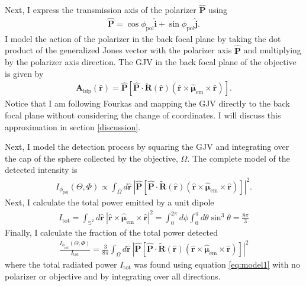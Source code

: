 \documentclass[11pt]{article}
\providecommand{\mb}[1]{\mathbf{#1}}
\providecommand{\mh}[1]{\mathbf{\hat{#1}}}
\providecommand{\bs}[1]{\boldsymbol{#1}}
\begin{document}
Next, I express the transmission axis of the polarizer $\mh{P}$ using
\begin{align}
  \hat{\mb{P}} = \cos\phi_{\text{pol}}\hat{\mb{i}} + \sin\phi_{\text{pol}}\hat{\mb{j}}. \label{eq:polarizer}
\end{align}
I model the action of the polarizer in the back focal plane by taking the
dot product of the generalized Jones vector with the polarizer axis $\mh{P}$ and multiplying by the polarizer axis direction. The GJV in the back focal plane of the objective is given by
\begin{align}
  \mb{A}_{\text{bfp}}(\mh{r}) = \mh{P}\left[\mh{P}\cdot\tilde{\mb{R}}(\mh{r})(\mh{r}\times\hat{\bs{\mu}}_{\text{em}}\times\mh{r})\right].\label{eq:approx}
\end{align}
Notice that I am following Fourkas and mapping the GJV directly to the back focal plane
without considering the change of coordinates. I will discuss this approximation in section \ref{discussion}.

Next, I model the detection process by squaring the GJV and integrating over
the cap of the sphere collected by the objective, $\Omega$. The complete model
of the detected intensity is
\begin{align}
  I_{\phi_{\text{pol}}}(\Theta, \Phi) \propto \int_{\Omega}d\mh{r}\ \left|\mh{P}\left[\mh{P}\cdot\tilde{\mb{R}}(\mh{r})(\mh{r}\times\hat{\bs{\mu}}_{\text{em}}\times\mh{r})\right]\right|^2. \label{eq:model1}
\end{align}
Next, I calculate the total power emitted by a unit dipole
\begin{align}
  I_{\text{tot}} = \int_{\mathbb{S}^2}d\mh{r}\ \left|\mh{r}\times\hat{\bs{\mu}}_{\text{em}}\times\mh{r}\right|^2 = \int_0^{2\pi}d\phi\int_0^{\pi}d\theta\sin^3\theta = \frac{8\pi}{3}
\end{align}
Finally, I calculate the fraction of the total power detected
\begin{align}
  \frac{I_{\phi_{\text{pol}}}(\Theta, \Phi)}{I_{\text{tot}}} = \frac{3}{8\pi}\int_{\Omega}d\mh{r}\ \left|\mh{P}\left[\mh{P}\cdot\tilde{\mb{R}}(\mh{r})(\mh{r}\times\hat{\bs{\mu}}_{\text{em}}\times\mh{r})\right]\right|^2\label{eq:final}
\end{align}
where the total radiated power $I_{\text{tot}}$ was found using equation \ref{eq:model1} with no polarizer or objective and by integrating over all directions. 
\end{document}
